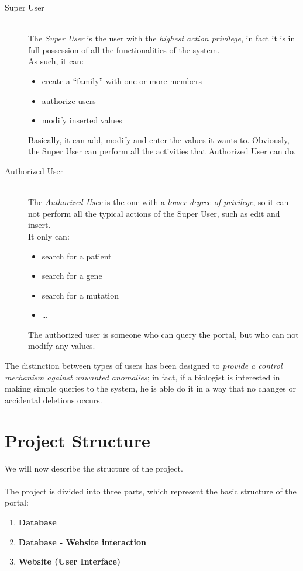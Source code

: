 \begin{description}
  \item[Super User] \hfill \\
  The \emph{Super User} is the user with the \emph{highest action privilege}, in fact it is in full possession of all the functionalities of the system.
\\As such, it can:
		\begin{itemize}
  		\item create a “family” with one or more members
 		 \item authorize users
 		 \item modify inserted values
		\end{itemize}
Basically, it can add, modify and enter the values it wants to. Obviously, the Super User can perform all the activities that Authorized User can do.
\\
  \item[Authorized User] \hfill \\
The \emph{Authorized User} is the one with a \emph{lower degree of privilege}, so it can not perform all the typical actions of the Super User, such as edit and insert. 
\\It only can:
		\begin{itemize}
  		\item search for a patient
		\item search for a gene
		\item search for a mutation
		\item \ldots
		\end{itemize}
The authorized user is someone who can query the portal, but who can not modify any values​​.
\\
\end{description}
The distinction between types of users has been designed to \emph{provide a control mechanism against unwanted anomalies}; in fact, if a biologist is interested in making simple queries to the system, he is able do it in a way that no changes or accidental deletions occurs.

\section{Project Structure}
We will now describe the structure of the project.
\\
\\The project is divided into three parts, which represent the basic structure of the portal:
\begin{enumerate}
  \item \textbf{Database}
  \item \textbf{Database - Website interaction}
  \item \textbf{Website (User Interface)}
\end{enumerate}

